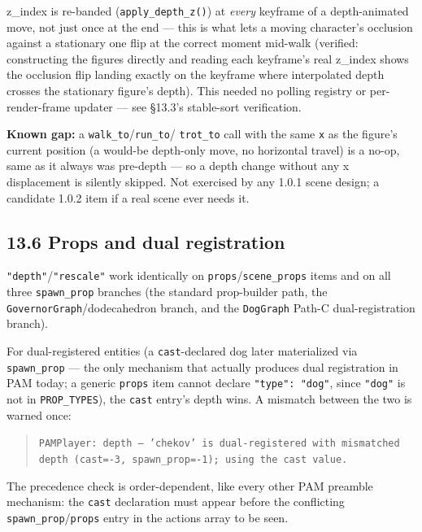 \documentclass[
  12pt,
  letterpaper,
]{book}
\begin{document}
z\_index is re-banded (\texttt{apply\_depth\_z()}) at \emph{every}
keyframe of a depth-animated move, not just once at the end --- this
is what lets a moving character's occlusion against a stationary one
flip at the correct moment mid-walk (verified: constructing the
figures directly and reading each keyframe's real z\_index shows the
occlusion flip landing exactly on the keyframe where interpolated
depth crosses the stationary figure's depth). This needed no polling
registry or per-render-frame updater --- see \S13.3's stable-sort
verification.

\textbf{Known gap:} a \texttt{walk\_to}/\texttt{run\_to}/
\texttt{trot\_to} call with the same \texttt{x} as the figure's
current position (a would-be depth-only move, no horizontal travel) is
a no-op, same as it always was pre-depth --- so a depth change without
any x displacement is silently skipped. Not exercised by any 1.0.1
scene design; a candidate 1.0.2 item if a real scene ever needs it.

\subsection{\texorpdfstring{13.6 Props and dual registration}{13.6 Props and dual registration}}\label{props-and-dual-registration}

\texttt{"depth"}/\texttt{"rescale"} work identically on
\texttt{props}/\texttt{scene\_props} items and on all three
\texttt{spawn\_prop} branches (the standard prop-builder path, the
\texttt{GovernorGraph}/dodecahedron branch, and the \texttt{DogGraph}
Path-C dual-registration branch).

For dual-registered entities (a \texttt{cast}-declared dog later
materialized via \texttt{spawn\_prop} --- the only mechanism that
actually produces dual registration in PAM today; a generic
\texttt{props} item cannot declare \texttt{"type": "dog"}, since
\texttt{"dog"} is not in \texttt{PROP\_TYPES}), the \texttt{cast}
entry's depth wins. A mismatch between the two is warned once:

\begin{quote}
\texttt{PAMPlayer: depth --- 'chekov' is dual-registered with
mismatched depth (cast=-3, spawn\_prop=-1); using the cast value.}
\end{quote}

The precedence check is order-dependent, like every other PAM preamble
mechanism: the \texttt{cast} declaration must appear before the
conflicting \texttt{spawn\_prop}/\texttt{props} entry in the actions
array to be seen.
\end{document}

